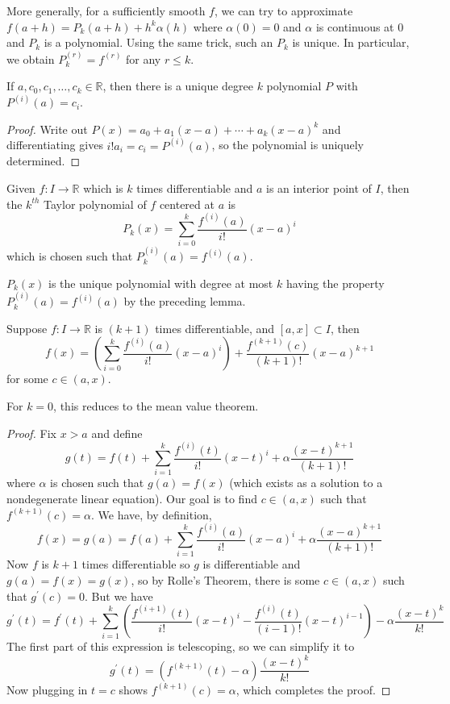More generally, for a sufficiently smooth $f$, we can try to approximate $f(a+h)=P_k(a+h)+h^k\alpha(h)$ where $\alpha(0)=0$ and $\alpha$ is continuous at $0$ and $P_k$ is a polynomial.
Using the same trick, such an $P_k$ is unique.
In particular, we obtain $P_k^{(r)}=f^{(r)}$ for any $r\le k$.
\begin{lemma}
    If $a,c_0,c_1,\ldots,c_k\in\mathbb R$, then there is a unique degree $k$ polynomial $P$ with $P^{(i)}(a)=c_i$.
\end{lemma}
\begin{proof}
    Write out $P(x)=a_0+a_1(x-a)+\cdots+a_k(x-a)^k$ and differentiating gives $i!a_i=c_i=P^{(i)}(a)$, so the polynomial is uniquely determined.
\end{proof}
\begin{definition}
    Given $f:I\to\mathbb R$ which is $k$ times differentiable and $a$ is an interior point of $I$, then the $k^{th}$ Taylor polynomial of $f$ centered at $a$ is
    $$P_k(x)=\sum_{i=0}^k\frac{f^{(i)}(a)}{i!}(x-a)^i$$
    which is chosen such that $P_k^{(i)}(a)=f^{(i)}(a)$.
\end{definition}
\begin{remark}
    $P_k(x)$ is the unique polynomial with degree at most $k$ having the property $P_k^{(i)}(a)=f^{(i)}(a)$ by the preceding lemma.
\end{remark}
\begin{theorem}
    Suppose $f:I\to\mathbb R$ is $(k+1)$ times differentiable, and $[a,x]\subset I$, then
    $$f(x)=\left(\sum_{i=0}^k\frac{f^{(i)}(a)}{i!}(x-a)^i\right)+\frac{f^{(k+1)}(c)}{(k+1)!}(x-a)^{k+1}$$
    for some $c\in (a,x)$.
\end{theorem}
For $k=0$, this reduces to the mean value theorem.
\begin{proof}
    Fix $x>a$ and define
    $$g(t)=f(t)+\sum_{i=1}^k\frac{f^{(i)}(t)}{i!}(x-t)^i+\alpha\frac{(x-t)^{k+1}}{(k+1)!}$$
    where $\alpha$ is chosen such that $g(a)=f(x)$ (which exists as a solution to a nondegenerate linear equation).
    Our goal is to find $c\in (a,x)$ such that $f^{(k+1)}(c)=\alpha$.
    We have, by definition,
    $$f(x)=g(a)=f(a)+\sum_{i=1}^k\frac{f^{(i)}(a)}{i!}(x-a)^i+\alpha\frac{(x-a)^{k+1}}{(k+1)!}$$
    Now $f$ is $k+1$ times differentiable so $g$ is differentiable and $g(a)=f(x)=g(x)$, so by Rolle's Theorem, there is some $c\in (a,x)$ such that $g^\prime(c)=0$.
    But we have
    $$g^\prime(t)=f^\prime(t)+\sum_{i=1}^k\left(\frac{f^{(i+1)}(t)}{i!}(x-t)^i-\frac{f^{(i)}(t)}{(i-1)!}(x-t)^{i-1}\right)-\alpha\frac{(x-t)^k}{k!}$$
    The first part of this expression is telescoping, so we can simplify it to
    $$g^\prime(t)=(f^{(k+1)}(t)-\alpha)\frac{(x-t)^k}{k!}$$
    Now plugging in $t=c$ shows $f^{(k+1)}(c)=\alpha$, which completes the proof.
\end{proof}
